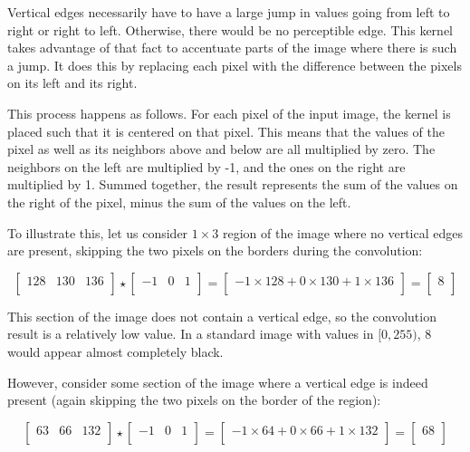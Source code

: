 Vertical edges necessarily have to have a large jump in values going from left to right or right to left. Otherwise, there would be no perceptible edge. This kernel takes advantage of that fact to accentuate parts of the image where there is such a jump. It does this by replacing each pixel with the difference between the pixels on its left and its right.

This process happens as follows. For each pixel of the input image, the kernel is placed such that it is centered on that pixel. This means that the values of the pixel as well as its neighbors above and below are all multiplied by zero. The neighbors on the left are multiplied by -1, and the ones on the right are multiplied by 1. Summed together, the result represents the sum of the values on the right of the pixel, minus the sum of the values on the left.

To illustrate this, let us consider $1 \times 3$ region of the image where no vertical edges are present, skipping the two pixels on the borders during the convolution:

\[
\begin{bmatrix}
128 & 130 & 136\\
\end{bmatrix}
\star
\begin{bmatrix}
-1 & 0 & 1\\
\end{bmatrix}
=
\begin{bmatrix}
-1 \times 128 + 0 \times 130 + 1 \times 136\\
\end{bmatrix}
=
\begin{bmatrix}
8\\
\end{bmatrix}
\]

This section of the image does not contain a vertical edge, so the convolution result is a relatively low value. In a standard image with values in $[0, 255)$, 8 would appear almost completely black.

However, consider some section of the image where a vertical edge is indeed present (again skipping the two pixels on the border of the region):

\[
\begin{bmatrix}
63 & 66 & 132\\
\end{bmatrix}
\star
\begin{bmatrix}
-1 & 0 & 1\\
\end{bmatrix}
=
\begin{bmatrix}
-1 \times 64 + 0 \times 66 + 1 \times 132\\
\end{bmatrix}
= 
\begin{bmatrix}
68\\
\end{bmatrix}
\]

